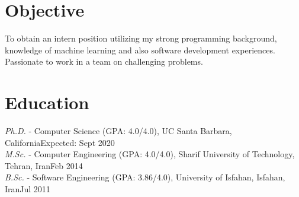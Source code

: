 \documentclass[letter]{res}
\begin{document}
	\newif \iflong
	\longtrue     %
	
	\address{+1 (805) 886 7101 ~~~ 6520 El Colegio Rd, Apt 2308, Santa Barbara, CA 93106. ~~~ \href{mailto:omid55@cs.ucsb.edu}{omid55@cs.ucsb.edu} ~~~ \href{https://github.com/omid55/}{Github} ~~~ \href{https://www.linkedin.com/in/omid-askarisichani-07bb5230}{LinkedIn}}
	\begin{resume}
		\noindent\makebox[\linewidth]{\rule{\paperwidth}{0.4pt}}
		
		
		\section{Objective}
		To obtain an intern position utilizing my strong programming background, knowledge of machine learning and also software development experiences. Passionate to work in a team on challenging problems.
		
		
		\section{Education}
		{\sl Ph.D.} - Computer Science (GPA: 4.0/4.0), UC Santa Barbara, California\hfill Expected: Sept 2020\vspace{-1mm}\\
		{\sl M.Sc.} - Computer Engineering (GPA: 4.0/4.0), Sharif University of Technology, Tehran, Iran\hfill Feb 2014\vspace{-1mm}\\
		{\sl B.Sc.} - Software Engineering (GPA: 3.86/4.0), University of Isfahan, Isfahan, Iran\hfill Jul 2011\vspace{-1mm}
		
		

\end{resume}
\end{document}
